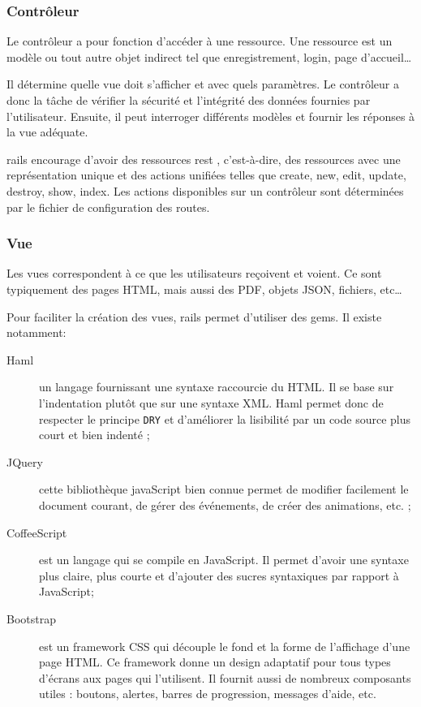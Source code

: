 \subsubsection{Contrôleur}
\label{controleur}
Le contrôleur a pour fonction d'accéder à une ressource. Une ressource est un modèle ou tout autre objet indirect tel que enregistrement, login, page d'accueil\ldots

Il détermine quelle vue doit s'afficher et avec quels paramètres. Le contrôleur a donc la tâche de vérifier la sécurité et l'intégrité des données fournies par l'utilisateur. Ensuite, il peut interroger différents modèles et fournir les réponses à la vue adéquate.

\label{rest}\label{rails-routes}
\gls{rails} encourage d'avoir des ressources \gls{rest} \cite{wiki-rest}, c'est-à-dire, des ressources avec une représentation unique et des actions unifiées telles que create, new, edit, update, destroy, show, index. Les actions disponibles sur un contrôleur sont déterminées par le fichier de configuration des routes.

\subsubsection{Vue}
Les vues correspondent à ce que les utilisateurs reçoivent et voient. Ce sont typiquement des pages HTML, mais aussi des PDF, objets JSON, fichiers, etc\ldots

Pour faciliter la création des vues, \gls{rails} permet d'utiliser des \glspl{gem}. Il existe notamment:
\begin{description}
  \item[Haml \cite{haml} \label{haml}] un langage fournissant une syntaxe raccourcie du HTML. Il se base sur l'indentation plutôt que sur une syntaxe XML. Haml permet donc de respecter le principe \texttt{DRY} et d'améliorer la lisibilité par un code source plus court et bien indenté ;
  \item[JQuery \cite{jquery}] cette bibliothèque javaScript bien connue permet de modifier facilement le document courant, de gérer des événements, de créer des animations, etc. ;
  \item[CoffeeScript \cite{coffeescript}] est un langage qui se compile en JavaScript. Il permet d'avoir une syntaxe plus claire, plus courte et d'ajouter des sucres syntaxiques par rapport à JavaScript;
  \item[Bootstrap \cite{bootstrap}] est un framework CSS qui découple le fond et la forme de l'affichage d'une page HTML. Ce framework donne un design adaptatif pour tous types d'écrans aux pages qui l'utilisent. Il fournit aussi de nombreux composants utiles : boutons, alertes, barres de progression, messages d'aide, etc. \label{bootstrap}
\end{description}
